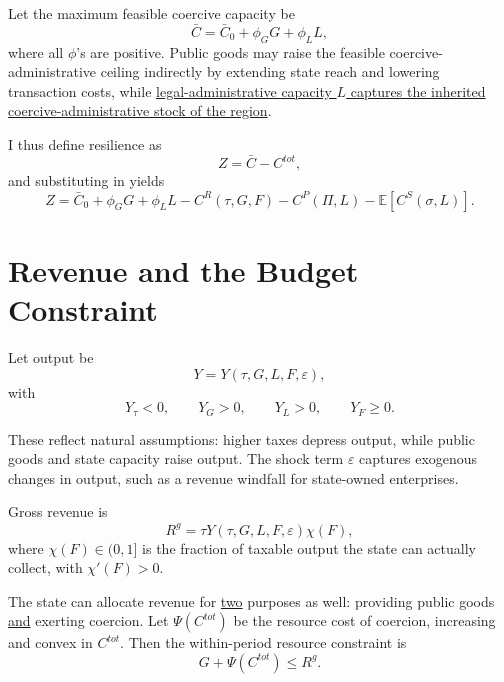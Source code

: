 \documentclass[12pt]{article}
\newcommand{\E}{\mathbb{E}}
\begin{document}
Let the maximum feasible coercive capacity be
\begin{equation}
\bar C = \bar C_0 + \phi_G G + \phi_L L,
\end{equation}
where all $\phi$'s are positive. Public goods may raise the feasible coercive-administrative ceiling indirectly by extending state reach and lowering transaction costs, while \underline{legal-administrative capacity $L$ captures the inherited coercive-administrative stock of the region}.

I thus define resilience as
\begin{equation}
Z = \bar C - C^{tot},
\end{equation}
and substituting in yields
\begin{equation}
Z = \bar C_0 + \phi_G G + \phi_L L - C^R(\tau,G,F) - C^P(\Pi,L) - \E[C^S(\sigma,L)].
\end{equation}

\section{Revenue and the Budget Constraint}

Let output be
\begin{equation}
Y = Y(\tau,G,L,F,\varepsilon),
\end{equation}
with
\begin{equation}
Y_{\tau} < 0, \qquad Y_G > 0, \qquad Y_L > 0, \qquad Y_F \ge 0.
\end{equation}

These reflect natural assumptions: higher taxes depress output, while public goods and state capacity raise output. The shock term $\varepsilon$ captures exogenous changes in output, such as a revenue windfall for state-owned enterprises.

Gross revenue is
\begin{equation}
R^g = \tau Y(\tau,G,L,F,\varepsilon)\chi(F),
\end{equation}
where $\chi(F) \in (0,1]$ is the fraction of taxable output the state can actually collect, with $\chi'(F)>0$.

The state can allocate revenue for \underline{two} purposes as well: providing public goods \underline{and} exerting coercion. Let $\Psi(C^{tot})$ be the resource cost of coercion, increasing and convex in $C^{tot}$. Then the within-period resource constraint is
\begin{equation}
G + \Psi(C^{tot}) \le R^g.
\end{equation}
\end{document}
